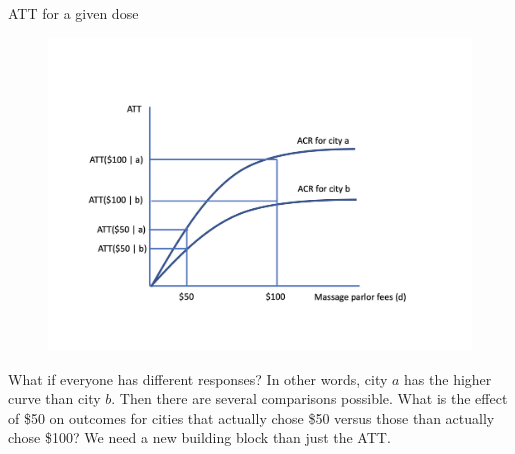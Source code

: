 \documentclass{beamer}
\begin{document}
\begin{frame}{ATT for a given dose}

\begin{figure}
\begin{center}
             \includegraphics[scale=0.3]{./lecture_includes/acrt_fig2.png}
\end{center}
\end{figure}

What if everyone has different responses?  In other words, city $a$ has the higher curve than city $b$.  Then there are several comparisons possible.  What is the effect of \$50 on outcomes for cities that actually chose \$50 versus those than actually chose \$100?  We need a new building block than just the ATT.

\end{frame}
\end{document}
